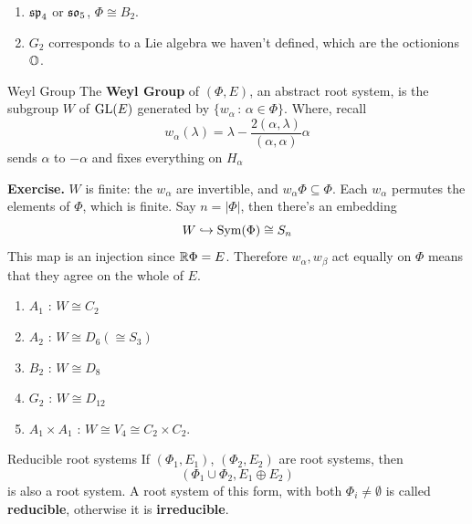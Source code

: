 \documentclass{article}
\begin{document}
\begin{exs*}
\begin{enumerate}
\[\begin{pmatrix}
    \end{pmatrix}, \begin{pmatrix}
        0 & &\\
        & 1 &\\
        & & -1
    \end{pmatrix} \right\rangle\] 
    has $\Phi = \{ \pm \alpha, \pm \beta, \pm(\alpha +\beta)\}$. where $\alpha(h_{1})=2, \alpha(h_{2})=-1$, $\beta(h_{1})=-1, \beta(h_{2})=2$. Then \[ \Phi \cong A_{2}.\]
    \item $\mathfrak{sp}_{4}$ or $\mathfrak{so}_{5}$, $\Phi \cong B_{2}$.
    \item $G_{2}$ corresponds to a Lie algebra we haven't defined, which are the octionions $\mathbb{O}$.
\end{enumerate}
\end{exs*}
\begin{fancydefine}{Weyl Group}
    The \textbf{Weyl Group} of $(\Phi, E)$, an abstract root system, is the subgroup $W$ of $\operatorname{GL}(E)$ generated by $\{ w_{\alpha} \, : \, \alpha \in \Phi\}$. Where, recall \[ w_{\alpha}(\lambda) = \lambda - \frac{2(\alpha,\lambda)}{(\alpha, \alpha)}\alpha\]
    sends $\alpha$ to $-\alpha$ and fixes everything on $H_{\alpha}$
\end{fancydefine}
\textbf{Exercise.} $W$ is finite: the $w_{\alpha}$ are invertible, and $w_{\alpha}\Phi \subseteq \Phi$. Each $w_{\alpha}$ permutes the elements of $\Phi$, which is finite. Say $n=|\Phi|$, then there's an embedding \[ W \hookrightarrow \operatorname{Sym}(\Phi) \cong S_{n}\] This map is an injection since $\mathbb{R} \Phi = E$. Therefore $w_{\alpha},w_{\beta}$ act equally on $\Phi$ means that they agree on the whole of $E$. \begin{exs*}\hspace{0.1cm}
    \begin{enumerate}
        \item $A_1$ : $W \cong C_{2}$
        \item $A_2$ : $W \cong D_{6} (\cong S_{3})$
        \item $B_{2}$ : $W \cong D_{8}$
        \item $G_2$ : $W \cong D_{12}$
        \item $A_1 \times A_1$ : $W \cong V_4 \cong C_2 \times C_2$.
    \end{enumerate}
\end{exs*}
\begin{fancylem}{Reducible root systems}
    If $(\Phi_{1},E_{1})$, $(\Phi_{2},E_{2})$ are root systems, then \[ (\Phi_{1} \cup \Phi_2, E_1 \oplus E_2)\] is also a root system. A root system of this form, with both $\Phi_i \neq \emptyset$ is called \textbf{reducible}, otherwise it is \textbf{irreducible}.
\end{fancylem}
\end{document}
